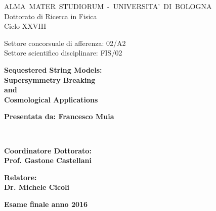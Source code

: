 \documentclass[12pt,a4paper]{book}
\begin{document}
\frontmatter

\begin{titlepage}


\begin{center}
{{\large{\mbox{ALMA MATER STUDIORUM - UNIVERSITA' DI~BOLOGNA}}}} \\
\vspace{2cm}
\Large{Dottorato di Ricerca in Fisica}\\
\large{Ciclo XXVIII}\\
\end{center}
\vspace{1cm}
Settore concorsuale di afferenza: 02/A2\\
Settore scientifico disciplinare: FIS/02
\vspace{1cm}
\begin{center}
\LARGE
\textbf{Sequestered String Models:\vspace{3mm}\\Supersymmetry Breaking\\and\vspace{3mm}\\Cosmological Applications\vspace{3mm}}
\normalsize
\end{center}
\vspace{2cm}
\par
\noindent
\raggedright
\begin{minipage}[t]{0.47\textwidth}
{\textbf{Presentata da: Francesco Muia\\
\vspace{1cm}}}
\end{minipage}\\
\begin{minipage}[t]{0.47\textwidth}
{\textbf{Coordinatore Dottorato:\\
Prof. Gastone Castellani}}
\end{minipage}
\hfill
\begin{minipage}[t]{0.47\textwidth}\raggedleft
{\textbf{Relatore:\\
Dr. Michele Cicoli}\\
\vspace{2cm}}
\end{minipage}
\centering
\textbf{Esame finale anno 2016}
\end{titlepage}

\cleardoublepage
\end{document}
